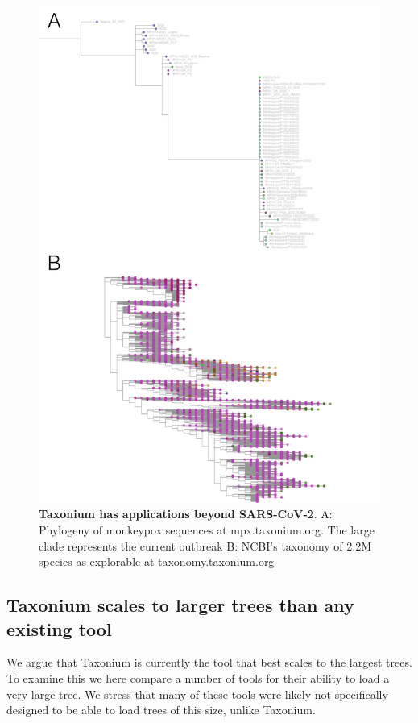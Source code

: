 \documentclass[twocolumn]{bioRxiv}
\begin{document}
\begin{figure}
\begin{center}
\includegraphics[width=\linewidth]{Figures/mpxtax.pdf}
\end{center}
\caption{
\textbf{Taxonium has applications beyond SARS-CoV-2}. A: Phylogeny of monkeypox sequences at mpx.taxonium.org. The large clade represents the current outbreak B: NCBI's taxonomy of 2.2M species as explorable at taxonomy.taxonium.org
}
\label{fig:cov2tree}
\end{figure}

\subsection*{Taxonium scales to larger trees than any existing tool}

We argue that Taxonium is currently the tool that best scales to the largest trees. To examine this we here compare a number of tools for their ability to load a very large tree. We stress that many of these tools were likely not specifically designed to be able to load trees of this size, unlike Taxonium.
\end{document}
